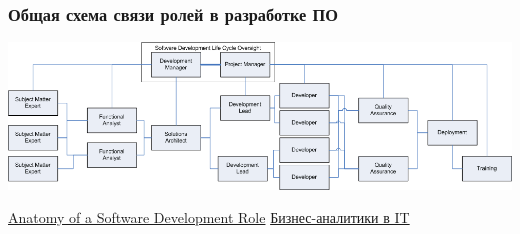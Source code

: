 \documentclass{../industrial-development}
\begin{document}
\begin{frame} \frametitle{Общая схема связи ролей в разработке ПО}
 \includegraphics[width=\textwidth]{Fullorgchart1}

\end{frame}

\begin{thebibliography}{99}

 \href{https://www.developer.com/tools/article.php/3526491/}{Anatomy of a Software Development Role}
 \href{https://itkeys.org/business-analysts/}{Бизнес-аналитики в IT}
\end{thebibliography}
\end{document}
